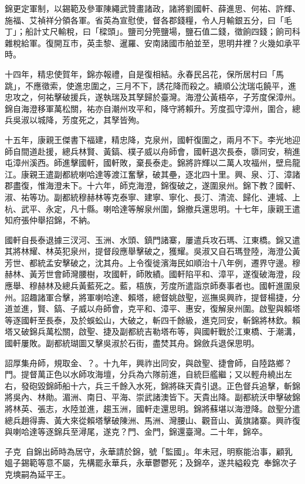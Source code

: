 \begin{pinyinscope}
錦更定軍制，以錫範及參軍陳繩武贊畫諸政，諸將劉國軒、薛進思、何祐、許輝、施福、艾禎祥分領各軍。省英為宣慰使，督各郡錢糧，令人月輸銀五分，曰「毛丁」；船計丈尺輸稅，曰「樑頭」。鹽司分筦鹽場，鹽石值二錢，徵餉四錢；餉司科雜稅給軍。復開互市，英圭黎、暹羅、安南諸國市舶並至，思明井裡？火幾如承平時。

十四年，精忠使賀年，錦亦報禮，自是復相結。永春民呂花，保所居村曰「馬跳」，不應徵索，使進忠圍之，三月不下，誘花降而殺之。續順公沈瑞屯饒平，進忠攻之，何祐擊破援兵，遂執瑞及其孥歸於臺灣。海澄公黃梧卒，子芳度保漳州。錦自海澄移軍萬松關，祐亦自潮州攻平和，降守將賴升。芳度孤守漳州，圍合，總兵吳淑以城降，芳度死之，其孥皆殉。

十五年，康親王傑書下福建，精忠降，克泉州，國軒復圍之，兩月不下。李光地迎師自間道赴援，總兵林賢、黃鎬、樸子威以舟師會，國軒退次長泰，隳同安，稍進屯漳州溪西。師進擊國軒，國軒敗，棄長泰走。錦將許輝以二萬人攻福州，壁烏龍江。康親王遣副都統喇哈達等渡江奮擊，破其壘，逐北四十里。興、泉、汀、漳諸郡盡復，惟海澄未下。十六年，師克海澄，錦復破之，遂圍泉州。錦下教？國軒、淑、祐等功。副都統穆赫林等克泰寧、建寧、寧化、長汀、清流、歸化、連城、上杭、武平、永定，凡十縣。喇哈達等解泉州圍，錦撤兵還思明。十七年，康親王遣知府張仲舉招錦，不納。

國軒自長泰退據三汊河、玉洲、水頭、鎮門諸寨，屢遣兵攻石瑪、江東橋。錦又遣其將林耀、林英犯泉州，提督段應舉擊破之，獲耀。吳淑又自石瑪登陸，海澄公黃芳世、都統孟安擊破之，沈其舟。上令復徙濱海民如順治十八年例，遷界守邊。穆赫林、黃芳世會師灣腰樹，攻國軒，師敗績。國軒陷平和、漳平，遂復破海澄，段應舉、穆赫林及總兵黃藍死之。藍，梧族，芳度所遣詣京師奏事者也。國軒進圍泉州。詔趣諸軍合擊，將軍喇哈達、賴塔，總督姚啟聖，巡撫吳興祚，提督楊捷，分道並進，賢、鎬、子威以舟師會，克平和、漳平、惠安，復解泉州圍。啟聖與賴塔等逐國軒至長泰，及於蜈蚣山，大破之，斬四千餘級，進克同安，斬錦將林欽。賴塔又破錦兵萬松關，啟聖、捷及副都統吉勒塔布等，與國軒戰於江東橋、于潮溝，國軒屢敗。副都統瑚圖又擊吳淑於石街，盡焚其舟。錦斂兵退保思明。

詔厚集舟師，規取金、？。十九年，興祚出同安，與啟聖、捷會師，自陸路鄉？門。提督萬正色以水師攻海壇，分兵為六隊前進，自統巨艦繼；又以輕舟繞出左右，發砲毀錦師船十六，兵三千餘入水死，錦將硃天貴引退。正色督兵追擊，斬錦將吳內、林勛。湄洲、南日、平海、崇武諸澳皆下。天貴出降。副都統沃申擊破錦將林英、張志，水陸並進，趨玉洲，國軒走還思明。錦將蘇堪以海澄降。啟聖分遣總兵趙得壽、黃大來從賴塔擊破陳洲、馬洲、灣腰山、觀音山、黃旗諸寨。興祚復與喇哈達等逐錦兵至潯尾，遂克？門、金門，錦還臺灣。二十年，錦卒。

子克，自錦出師時為居守，永華請於錦，號「監國」。年未冠，明察能治事，顧乳媼子錫範等意不屬，先構罷永華兵，永華鬱鬱死；及錦卒，遂共縊殺克，奉錦次子克塽嗣為延平王。


\end{pinyinscope}
